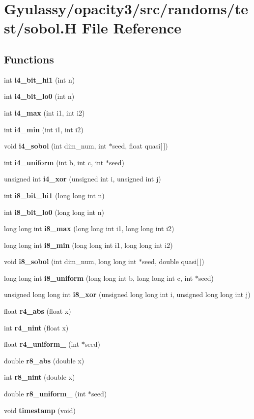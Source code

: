 \section{Gyulassy/opacity3/src/randoms/test/sobol.H File Reference}
\label{test_2sobol_8H}
\subsection*{Functions}
\begin{CompactItemize}
\item 
int {\bf i4\_\-bit\_\-hi1} (int n)
\item 
int {\bf i4\_\-bit\_\-lo0} (int n)
\item 
int {\bf i4\_\-max} (int i1, int i2)
\item 
int {\bf i4\_\-min} (int i1, int i2)
\item 
void {\bf i4\_\-sobol} (int dim\_\-num, int $\ast$seed, float quasi[$\,$])
\item 
int {\bf i4\_\-uniform} (int b, int c, int $\ast$seed)
\item 
unsigned int {\bf i4\_\-xor} (unsigned int i, unsigned int j)
\item 
int {\bf i8\_\-bit\_\-hi1} (long long int n)
\item 
int {\bf i8\_\-bit\_\-lo0} (long long int n)
\item 
long long int {\bf i8\_\-max} (long long int i1, long long int i2)
\item 
long long int {\bf i8\_\-min} (long long int i1, long long int i2)
\item 
void {\bf i8\_\-sobol} (int dim\_\-num, long long int $\ast$seed, double quasi[$\,$])
\item 
long long int {\bf i8\_\-uniform} (long long int b, long long int c, int $\ast$seed)
\item 
unsigned long long int {\bf i8\_\-xor} (unsigned long long int i, unsigned long long int j)
\item 
float {\bf r4\_\-abs} (float x)
\item 
int {\bf r4\_\-nint} (float x)
\item 
float {\bf r4\_\-uniform\_} (int $\ast$seed)
\item 
double {\bf r8\_\-abs} (double x)
\item 
int {\bf r8\_\-nint} (double x)
\item 
double {\bf r8\_\-uniform\_} (int $\ast$seed)
\item 
void {\bf timestamp} (void)
\end{CompactItemize}


